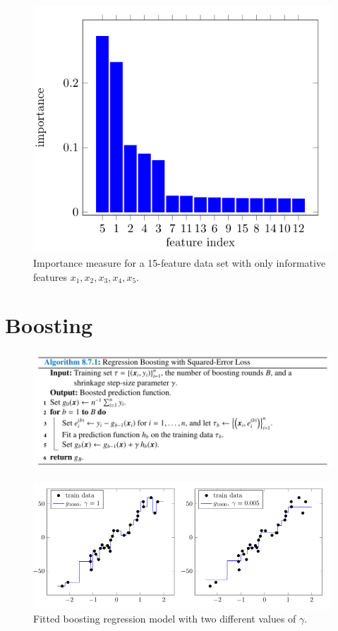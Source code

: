 \documentclass{beamer}
\begin{document}
\begin{frame}
    \begin{figure}
        \includegraphics[width=0.7\linewidth]{F89Kroese}
        \caption{Importance measure for a 15-feature data set with only informative features $x_1,x_2,x_3,x_4,x_5$\cite{kroese2020}.}
    \end{figure}
\end{frame}

\section{Boosting}

\begin{frame}
    \begin{figure}
        \includegraphics[width=0.9\linewidth]{A871Kroese}
    \end{figure}
\end{frame}

\begin{frame}
    \begin{figure}
        \includegraphics[width=0.9\linewidth]{F810Kroese}
        \caption{Fitted boosting regression model with two different values of $\gamma$. \cite{kroese2020}}
    \end{figure}
\end{frame}
\end{document}

